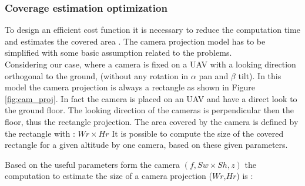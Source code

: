 \subsubsection{Coverage estimation optimization} \label{sec:coverageEstimation}
To design an efficient cost function it is necessary to reduce the  computation time and estimates the covered area . %
  The camera projection model has to be simplified with some basic assumption related to the problems.\\
Considering our case, where a camera is fixed on a UAV with a looking direction orthogonal to the ground, (without any rotation in $\alpha$ pan and $\beta$ tilt). 
In this model the camera projection is always a rectangle as shown in Figure \ref{fig:cam_proj}. In fact the camera is  placed on an UAV and have a direct look to the ground floor. The looking direction of the cameras is  perpendicular then the floor, thus the rectangle projection.
The area covered  by the camera is defined by the rectangle with : $Wr\times Hr$ 
It is possible to compute the size of the covered rectangle for a given altitude by one camera, based on these given parameters. 

Based on the useful parameters form the camera $(f ,Sw\times Sh ,z)$ the computation to estimate the size of a camera projection ($Wr$,$Hr$) is :

%

	
